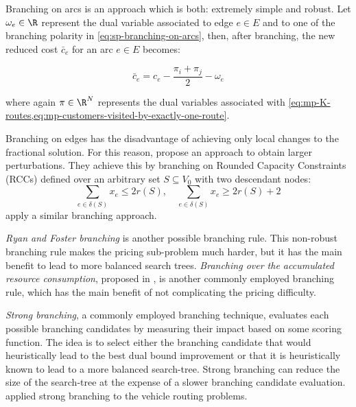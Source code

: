 Branching on arcs is an approach which is both: extremely simple and robust.
Let $\omega_e \in \R$ represent the dual variable associated to
edge $e \in E$ and to
one of the branching polarity in \cref{eq:sp-branching-on-arcs},
then, after branching,
the new reduced cost $\bar{c}_e$ for an arc $e \in E$ becomes:

\begin{equation}
\bar{c}_e = c_e - \frac{\pi_i + \pi_j}{2} - \omega_e
\end{equation}

where again $\pi \in \R^N$ represents the dual variables associated with \cref{eq:mp-K-routes,eq:mp-customers-visited-by-exactly-one-route}.

Branching on edges has the disadvantage of achieving only local changes
to the fractional solution.
For this reason, \textcite{augerat1998} propose an
approach to obtain larger perturbations.
They achieve this by branching on Rounded Capacity Constraints (RCCs) defined over
an arbitrary set $S \subseteq V_0$ with two descendant nodes:
\begin{equation}\label{eq:sp-branching-on-cutsets}
	\sum_{e \in \delta(S)}x_e \le 2 r(S), \quad
	\sum_{e \in \delta(S)}x_e \ge 2 r(S) + 2
\end{equation}
\textcite{pecin2017improved} apply a similar branching approach.

\textit{Ryan and Foster branching} \parencite{ryan1981integer} is another possible branching rule.
This non-robust branching rule makes the pricing sub-problem much harder,
but it has the main benefit to lead to more balanced search trees.
\textit{Branching over the accumulated resource consumption}, proposed in \textcite{gelinas1995new},
is another commonly employed branching rule, which has the main benefit of not complicating
the pricing difficulty.


\textit{Strong branching}, a commonly employed branching technique,
evaluates each possible branching candidates
by measuring their impact based on some scoring function.
The idea is to select either the branching candidate that
would heuristically lead to the best dual bound improvement
or that it is heuristically known to lead to a more balanced search-tree.
Strong branching can reduce the size of the search-tree
at the expense of a slower branching candidate evaluation.
\textcite{fukasawa2006, pecin2017limited, pecin2017new} applied strong branching
to the vehicle routing problems.

\medskip

